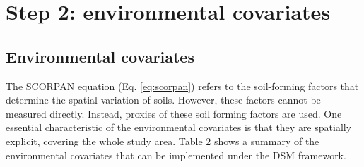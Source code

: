 \documentclass[
  10pt,
  b5paper,
  oneside]{book}
\begin{document}
\hypertarget{step-2-environmental-covariates}{%
\chapter{Step 2: environmental covariates}\label{step-2-environmental-covariates}}

\hypertarget{environmental-covariates}{%
\section{Environmental covariates}\label{environmental-covariates}}

The SCORPAN equation (Eq. \ref{eq:scorpan}) refers to the soil-forming factors that determine the spatial variation of soils. However, these factors cannot be measured directly. Instead, proxies of these soil forming factors are used. One essential characteristic of the environmental covariates is that they are spatially explicit, covering the whole study area. Table 2 shows a summary of the environmental covariates that can be implemented under the DSM framework.
\end{document}
